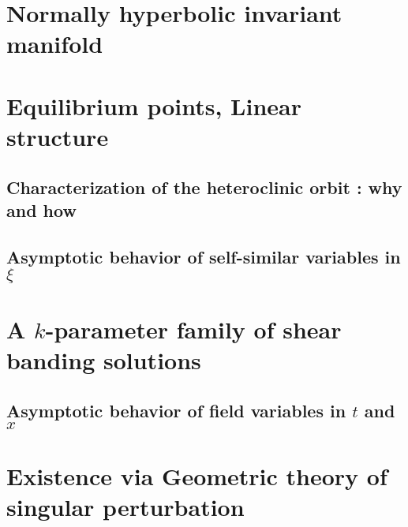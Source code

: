 \documentclass[a4paper,11pt]{article}
\begin{document}
\section{Normally hyperbolic invariant manifold}
\section{Equilibrium points, Linear structure}
\subsection{Characterization of the heteroclinic orbit : why and how}
\subsection{Asymptotic behavior of self-similar variables in $\xi$}
\section{A $k$-parameter family of shear banding solutions}
\subsection{Asymptotic behavior of field variables in $t$ and $x$}
\section{Existence via Geometric theory of singular perturbation}
\end{document}
